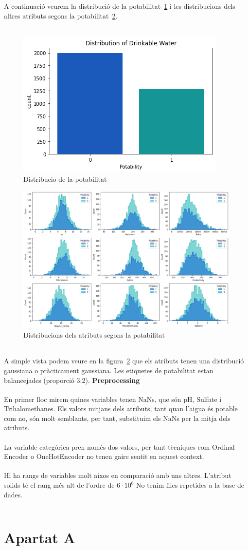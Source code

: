 \documentclass{article}
\begin{document}
	A continuació veurem la distribució de la potabilitat~\ref{fig:distribuciopotabilitat} i les distribucions dels altres atributs segons la potabilitat~\ref{fig:distribucions}.\\
	\\
	\begin{figure}[!h]
		\centering
		\includegraphics[width=0.4\linewidth]{../images/distribucio_potabilitat}
		\caption{Distribucio de la potabilitat}
		\label{fig:distribuciopotabilitat}
	\end{figure}
	\begin{figure}[!h]
		\centering
		\includegraphics[width=0.7\linewidth]{../images/distribucions}
		\caption{Distribucions dels atributs segons la potabilitat}
		\label{fig:distribucions}
	\end{figure}\\
	A simple vista podem veure en la figura~\ref{fig:distribucions} que els atributs tenen una distribució gaussiana o pràcticament gaussiana. Les etiquetes de potabilitat estan balancejades (proporció 3:2).
	\clearpage
	\noindent
	\textbf{Preprocessing}\\
	\\
	En primer lloc mirem quines variables tenen NaNs, que són pH, Sulfate i Trihalomethanes. Els valors mitjans dels atributs, tant quan l'aigua és potable com no, són molt semblants, per tant, substituim els NaNs per la mitja dels atributs.\\
	\\
	La variable categòrica pren només dos valors, per tant tècniques com Ordinal Encoder o OneHotEncoder no tenen gaire sentit en aquest context.\\
	\\
	Hi ha rangs de variables molt aixos en comparació amb uns altres. L'atribut solids té el rang més alt de l'ordre de $6\cdot10^6$
	No tenim files repetides a la base de dades.\\
	\\
	
	
	
	
	
	\section*{Apartat A}

	
	
\end{document}
